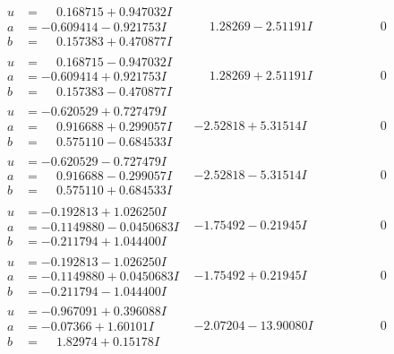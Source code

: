 \documentclass[1p]{elsarticle_modified}
\theoremstyle{definition}
\begin{document}
$$\begin{array}{c|c|c}
\begin{aligned}
u &= \phantom{-}0.168715 + 0.947032 I \\
a &= -0.609414 - 0.921753 I \\
b &= \phantom{-}0.157383 + 0.470877 I\end{aligned}
 & \phantom{-}1.28269 - 2.51191 I & \phantom{-0.000000 } 0 \\ \hline\begin{aligned}
u &= \phantom{-}0.168715 - 0.947032 I \\
a &= -0.609414 + 0.921753 I \\
b &= \phantom{-}0.157383 - 0.470877 I\end{aligned}
 & \phantom{-}1.28269 + 2.51191 I & \phantom{-0.000000 } 0 \\ \hline\begin{aligned}
u &= -0.620529 + 0.727479 I \\
a &= \phantom{-}0.916688 + 0.299057 I \\
b &= \phantom{-}0.575110 - 0.684533 I\end{aligned}
 & -2.52818 + 5.31514 I & \phantom{-0.000000 } 0 \\ \hline\begin{aligned}
u &= -0.620529 - 0.727479 I \\
a &= \phantom{-}0.916688 - 0.299057 I \\
b &= \phantom{-}0.575110 + 0.684533 I\end{aligned}
 & -2.52818 - 5.31514 I & \phantom{-0.000000 } 0 \\ \hline\begin{aligned}
u &= -0.192813 + 1.026250 I \\
a &= -0.1149880 - 0.0450683 I \\
b &= -0.211794 + 1.044400 I\end{aligned}
 & -1.75492 - 0.21945 I & \phantom{-0.000000 } 0 \\ \hline\begin{aligned}
u &= -0.192813 - 1.026250 I \\
a &= -0.1149880 + 0.0450683 I \\
b &= -0.211794 - 1.044400 I\end{aligned}
 & -1.75492 + 0.21945 I & \phantom{-0.000000 } 0 \\ \hline\begin{aligned}
u &= -0.967091 + 0.396088 I \\
a &= -0.07366 + 1.60101 I \\
b &= \phantom{-}1.82974 + 0.15178 I\end{aligned}
 & -2.07204 - 13.90080 I & \phantom{-0.000000 } 0 \\ \hline\begin{aligned}

\end{aligned}
\end{array}$$
\end{document}
